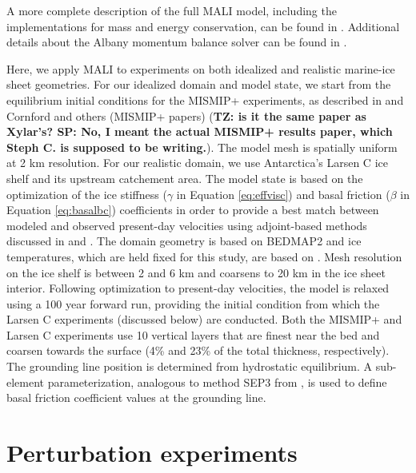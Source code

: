 \documentclass[review,oneside]{igs}
\begin{document}
A more complete description of the full MALI model, including the implementations for mass and energy conservation, can be found in \cite{hoffman2018}. Additional details about the Albany momentum balance solver can be found in \cite{tezaur2015a,tezaur2015b}. 

Here, we apply MALI to experiments on both idealized and realistic marine-ice sheet geometries. For our idealized domain and model state, we start from the equilibrium initial conditions for the MISMIP+ experiments, as described in \cite{asay2016} and Cornford and others (MISMIP+ papers) ({\bf{TZ: is it the same paper as Xylar's? SP: No, I meant the actual MISMIP+ results paper, which Steph C. is supposed to be writing.}}). The model mesh is spatially uniform at 2 km resolution. For our realistic domain, we use Antarctica's Larsen C ice shelf and its upstream catchement area. The model state is based on the optimization of the ice stiffness ($\gamma$ in Equation \ref{eq:effvisc}) and basal friction ($\beta$ in Equation \ref{eq:basalbc}) coefficients in order to provide a best match between modeled and observed present-day velocities \citep{rignot2014} using adjoint-based methods discussed in \cite{perego2014} and \cite{hoffman2018}. The domain geometry is based on BEDMAP2 \citep{fretwell2013} and ice temperatures, which are held fixed for this study, are based on \cite{liefferinge2013}. Mesh resolution on the ice shelf is between 2 and 6 km and coarsens to 20 km in the ice sheet interior. Following optimization to present-day velocities, the model is relaxed using a 100 year forward run, providing the initial condition from which the Larsen C experiments (discussed below) are conducted. Both the MISMIP+ and Larsen C experiments use 10 vertical layers that are finest near the bed and coarsen towards the surface (4\% and 23\% of the total thickness, respectively). The grounding line position is determined from hydrostatic equilibrium. A sub-element parameterization, analogous to method SEP3 from \cite{seroussi2014}, is used to define basal friction coefficient values at the grounding line. 


\section{Perturbation experiments}
\end{document}
